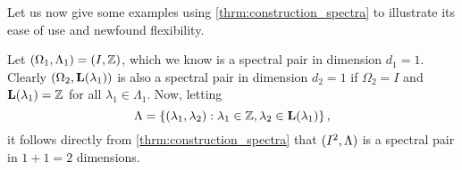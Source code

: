 \documentclass[../thesis.tex]{subfiles}
\begin{document}
Let us now give some examples using \cref{thrm:construction_spectra} to illustrate its ease of use and newfound flexibility. 
\begin{example}\label{ex:first_construction}
    Let $(\Omega_1,\Lambda_1)=(I, \mathbb{Z})$, which we know is a spectral pair in dimension $d_1=1$. Clearly $(\Omega_2,\mathbf{L}(\lambda_1))$ is also a spectral pair in dimension $d_2=1$ if $\Omega_2=I$ and $\mathbf{L}(\lambda_1) = \mathbb{Z}$ for all $\lambda_1 \in \Lambda_1$. Now, letting 
    \begin{equation*}%
        \Lambda  = \braqMed{\brac{\lambda_1,\lambda_2}: \lambda_1 \in \Z, \lambda_2 \in \lambfunc },
    \end{equation*}
    it follows directly from \cref{thrm:construction_spectra} that $(I^2, \Lambda)$ is a spectral pair in $1+1=2$ dimensions.
\end{example}
\end{document}
